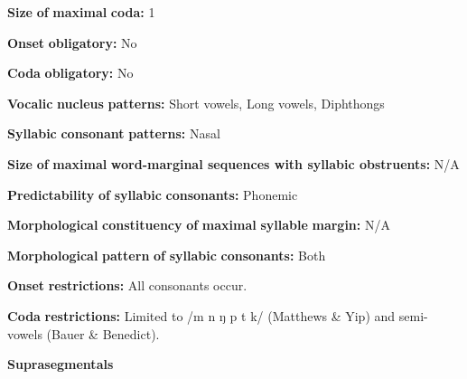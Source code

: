 \begin{styleBody}
\textbf{Size} \textbf{of} \textbf{maximal} \textbf{coda:} 1
\end{styleBody}

\begin{styleBody}
\textbf{Onset} \textbf{obligatory:} No
\end{styleBody}

\begin{styleBody}
\textbf{Coda} \textbf{obligatory:} No
\end{styleBody}

\begin{styleBody}
\textbf{Vocalic} \textbf{nucleus} \textbf{patterns:} Short vowels, Long vowels, Diphthongs
\end{styleBody}

\begin{styleBody}
\textbf{Syllabic} \textbf{consonant} \textbf{patterns:} Nasal
\end{styleBody}

\begin{styleBody}
\textbf{Size} \textbf{of} \textbf{maximal} \textbf{word{}-marginal sequences with syllabic obstruents:} N/A
\end{styleBody}

\begin{styleBody}
\textbf{Predictability} \textbf{of} \textbf{syllabic} \textbf{consonants:} Phonemic
\end{styleBody}

\begin{styleBody}
\textbf{Morphological} \textbf{constituency} \textbf{of} \textbf{maximal} \textbf{syllable} \textbf{margin:} N/A
\end{styleBody}

\begin{styleBody}
\textbf{Morphological} \textbf{pattern} \textbf{of} \textbf{syllabic} \textbf{consonants:} Both
\end{styleBody}

\begin{styleBody}
\textbf{Onset} \textbf{restrictions:} All consonants occur.
\end{styleBody}

\begin{styleBody}
\textbf{Coda} \textbf{restrictions:} Limited to /m n ŋ p t k/ (Matthews \& Yip) and semi-vowels (Bauer \& Benedict).
\end{styleBody}

\begin{styleBody}
\textbf{Suprasegmentals}
\end{styleBody}

